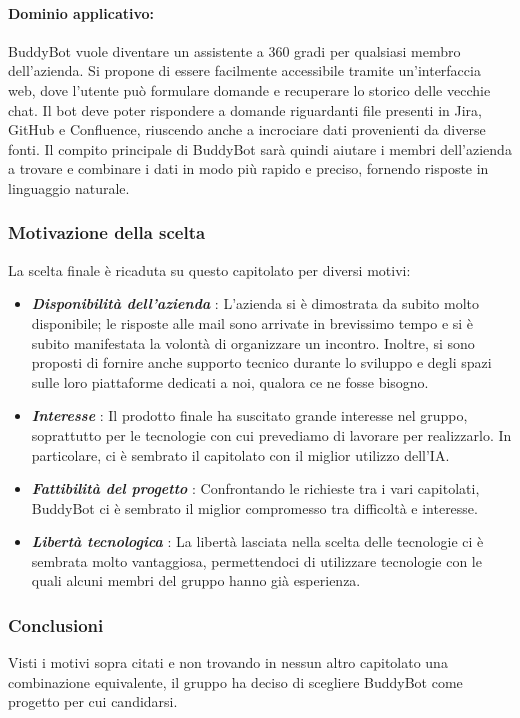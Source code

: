 \paragraph{Dominio applicativo:}
BuddyBot vuole diventare un assistente a 360 gradi per qualsiasi membro 
dell'azienda. Si propone di essere facilmente accessibile tramite
un'interfaccia web, dove l'utente può formulare domande e recuperare lo storico delle vecchie chat.
Il bot deve poter rispondere a domande riguardanti file presenti in Jira, GitHub e Confluence, 
riuscendo anche a incrociare dati provenienti da diverse fonti. Il compito principale di 
BuddyBot sarà quindi aiutare i membri dell'azienda a trovare e combinare i dati in 
modo più rapido e preciso, fornendo risposte in linguaggio naturale.

\subsubsection{Motivazione della scelta}
La scelta finale è ricaduta su questo capitolato per diversi motivi:
\begin{itemize}
    \item \textit{\textbf{Disponibilità dell'azienda}}
    : L'azienda si è dimostrata da subito molto disponibile; le risposte alle 
    mail sono arrivate in brevissimo tempo e si è subito manifestata la volontà 
    di organizzare un incontro. Inoltre, si sono proposti di fornire anche 
    supporto tecnico durante lo sviluppo e degli spazi sulle loro piattaforme 
    dedicati a noi, qualora ce ne fosse bisogno.
    \item \textit{\textbf{Interesse}}
    : Il prodotto finale ha suscitato grande interesse nel gruppo, 
    soprattutto per le tecnologie con cui prevediamo di lavorare per 
    realizzarlo. In particolare, ci è sembrato il capitolato con il miglior 
    utilizzo dell'IA.
    \item \textit{\textbf{Fattibilità del progetto}}
    : Confrontando le richieste tra i vari capitolati, BuddyBot ci è 
    sembrato il miglior compromesso tra difficoltà e interesse.
    \item \textit{\textbf{Libertà tecnologica}}
    : La libertà lasciata nella scelta delle tecnologie ci è sembrata
     molto vantaggiosa, permettendoci di utilizzare tecnologie con le
      quali alcuni membri del gruppo hanno già esperienza.
\end{itemize}

\subsubsection{Conclusioni}
Visti i motivi sopra citati e non trovando in nessun altro capitolato una combinazione equivalente, 
il gruppo ha deciso di scegliere BuddyBot come progetto per cui candidarsi.
